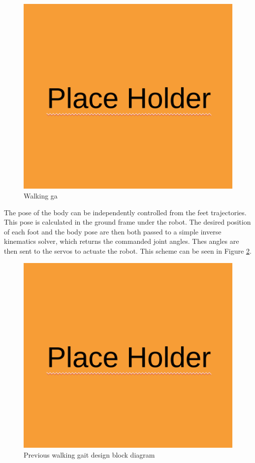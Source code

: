 \begin{figure}[H]
    \centerline{\includegraphics[scale=0.25]{place_holder.png}}
    \caption{Walking ga}
    \label{fig:old_gait}
\end{figure}

The pose of the body can be independently controlled from the feet trajectories. This pose is calculated in the ground frame under the robot. The desired position of each foot and the body pose are then both passed to a simple inverse kinematics solver, which returns the commanded joint angles. Thes angles are then sent to the servos to actuate the robot. This scheme can be seen in Figure \ref{fig:old_gait_block_diagram}.

\begin{figure}[H]
    \centerline{\includegraphics[scale=0.25]{place_holder.png}}
    \caption{Previous walking gait design block diagram}
    \label{fig:old_gait_block_diagram}
\end{figure}
